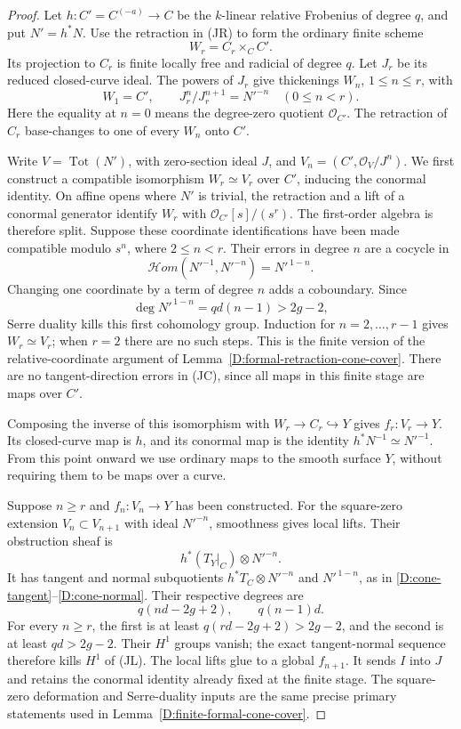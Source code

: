 \begin{proof}
Let $h:C'=C^{(-a)}\to C$ be the $k$-linear relative
Frobenius of degree $q$, and put $N'=h^*N$.
Use the retraction in (JR) to form the ordinary finite
scheme
\[
                      W_r=C_r\times_C C'.
\]
Its projection to $C_r$ is finite locally free and
radicial of degree $q$.  Let $J_r$ be its reduced
closed-curve ideal.  The powers of $J_r$ give
thickenings $W_n$, $1\leq n\leq r$, with
\[
 W_1=C',\qquad J_r^n/J_r^{n+1}=N'^{-n}
                    \quad(0\leq n<r).
\]
Here the equality at $n=0$ means the degree-zero
quotient $\mathcal O_{C'}$.  The retraction of $C_r$
base-changes to one of every $W_n$ onto $C'$.

Write $V=\operatorname{Tot}(N')$, with zero-section
ideal $J$, and $V_n=(C',\mathcal O_V/J^n)$.
We first construct a compatible isomorphism
$W_r\simeq V_r$ over $C'$, inducing the conormal identity.
On affine opens where $N'$ is trivial, the retraction
and a lift of a conormal generator identify $W_r$
with $\mathcal O_{C'}[s]/(s^r)$.
The first-order algebra is therefore split.
Suppose these coordinate identifications have been made
compatible modulo $s^n$, where $2\leq n<r$.
Their errors in degree $n$ are a cocycle in
\[
 \mathcal Hom(N'^{-1},N'^{-n})=N'^{\,1-n}.
 \tag{JC}
\]
Changing one coordinate by a term of degree $n$
adds a coboundary.  Since
\[
             \deg N'^{\,1-n}=qd(n-1)>2g-2,
\]
Serre duality kills this first cohomology group.
Induction for $n=2,\ldots,r-1$ gives $W_r\simeq V_r$;
when $r=2$ there are no such steps.
This is the finite version of the relative-coordinate
argument of Lemma~\ref{D:formal-retraction-cone-cover}.
There are no tangent-direction errors in (JC), since
all maps in this finite stage are maps over $C'$.

Composing the inverse of this isomorphism with
$W_r\to C_r\hookrightarrow Y$ gives
$f_r:V_r\to Y$.  Its closed-curve map is $h$, and its
conormal map is the identity
$h^*N^{-1}\simeq N'^{-1}$.  From this point onward we
use ordinary maps to the smooth surface $Y$, without
requiring them to be maps over a curve.

Suppose $n\geq r$ and $f_n:V_n\to Y$ has been constructed.
For the square-zero extension $V_n\subset V_{n+1}$
with ideal $N'^{-n}$, smoothness gives local lifts.
Their obstruction sheaf is
\[
                  h^*(T_Y|_C)\otimes N'^{-n}.
 \tag{JL}
\]
It has tangent and normal subquotients
$h^*T_C\otimes N'^{-n}$ and $N'^{\,1-n}$, as in
\eqref{D:cone-tangent}--\eqref{D:cone-normal}.
Their respective degrees are
\[
                 q(nd-2g+2),\qquad q(n-1)d.
 \tag{JD}
\]
For every $n\geq r$, the first is at least
$q(rd-2g+2)>2g-2$, and the second is at least
$qd>2g-2$.  Their $H^1$ groups vanish; the exact
tangent-normal sequence therefore kills $H^1$ of
(JL).  The local lifts glue to a global $f_{n+1}$.
It sends $I$ into $J$ and retains the conormal identity
already fixed at the finite stage.
The square-zero deformation and Serre-duality inputs
are the same precise primary statements used in
Lemma~\ref{D:finite-formal-cone-cover}.


\end{proof}
